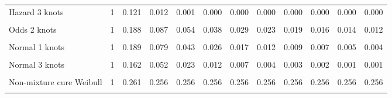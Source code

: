 \documentclass[
]{article}
\begin{document}
\begin{table}[H]
{\begin{tabular}[t]{lrrrrrrrrrrr}
Hazard 3 knots & 1 & 0.121 & 0.012 & 0.001 & 0.000 & 0.000 & 0.000 & 0.000 & 0.000 & 0.000 & 0.000\\
\cellcolor{gray!10}{Odds 1 knots} & \cellcolor{gray!10}{1} & \cellcolor{gray!10}{0.205} & \cellcolor{gray!10}{0.105} & \cellcolor{gray!10}{0.069} & \cellcolor{gray!10}{0.051} & \cellcolor{gray!10}{0.040} & \cellcolor{gray!10}{0.033} & \cellcolor{gray!10}{0.027} & \cellcolor{gray!10}{0.024} & \cellcolor{gray!10}{0.021} & \cellcolor{gray!10}{0.018}\\
Odds 2 knots & 1 & 0.188 & 0.087 & 0.054 & 0.038 & 0.029 & 0.023 & 0.019 & 0.016 & 0.014 & 0.012\\
\cellcolor{gray!10}{Odds 3 knots} & \cellcolor{gray!10}{1} & \cellcolor{gray!10}{0.168} & \cellcolor{gray!10}{0.067} & \cellcolor{gray!10}{0.037} & \cellcolor{gray!10}{0.025} & \cellcolor{gray!10}{0.018} & \cellcolor{gray!10}{0.014} & \cellcolor{gray!10}{0.011} & \cellcolor{gray!10}{0.009} & \cellcolor{gray!10}{0.007} & \cellcolor{gray!10}{0.006}\\
Normal 1 knots & 1 & 0.189 & 0.079 & 0.043 & 0.026 & 0.017 & 0.012 & 0.009 & 0.007 & 0.005 & 0.004\\
\cellcolor{gray!10}{Normal 2 knots} & \cellcolor{gray!10}{1} & \cellcolor{gray!10}{0.188} & \cellcolor{gray!10}{0.078} & \cellcolor{gray!10}{0.042} & \cellcolor{gray!10}{0.025} & \cellcolor{gray!10}{0.017} & \cellcolor{gray!10}{0.012} & \cellcolor{gray!10}{0.009} & \cellcolor{gray!10}{0.006} & \cellcolor{gray!10}{0.005} & \cellcolor{gray!10}{0.004}\\
Normal 3 knots & 1 & 0.162 & 0.052 & 0.023 & 0.012 & 0.007 & 0.004 & 0.003 & 0.002 & 0.001 & 0.001\\
\cellcolor{gray!10}{Mixture cure Weibull} & \cellcolor{gray!10}{1} & \cellcolor{gray!10}{0.268} & \cellcolor{gray!10}{0.266} & \cellcolor{gray!10}{0.266} & \cellcolor{gray!10}{0.266} & \cellcolor{gray!10}{0.266} & \cellcolor{gray!10}{0.266} & \cellcolor{gray!10}{0.266} & \cellcolor{gray!10}{0.266} & \cellcolor{gray!10}{0.266} & \cellcolor{gray!10}{0.266}\\
Non-mixture cure Weibull & 1 & 0.261 & 0.256 & 0.256 & 0.256 & 0.256 & 0.256 & 0.256 & 0.256 & 0.256 & 0.256\\
\cellcolor{gray!10}{Mixture cure Log-normal} & \cellcolor{gray!10}{1} & \cellcolor{gray!10}{0.231} & \cellcolor{gray!10}{0.188} & \cellcolor{gray!10}{0.182} & \cellcolor{gray!10}{0.180} & \cellcolor{gray!10}{0.180} & \cellcolor{gray!10}{0.179} & \cellcolor{gray!10}{0.179} & \cellcolor{gray!10}{0.179} & \cellcolor{gray!10}{0.179} & \cellcolor{gray!10}{0.179}\\

\end{tabular}}
\end{table}
\end{document}
